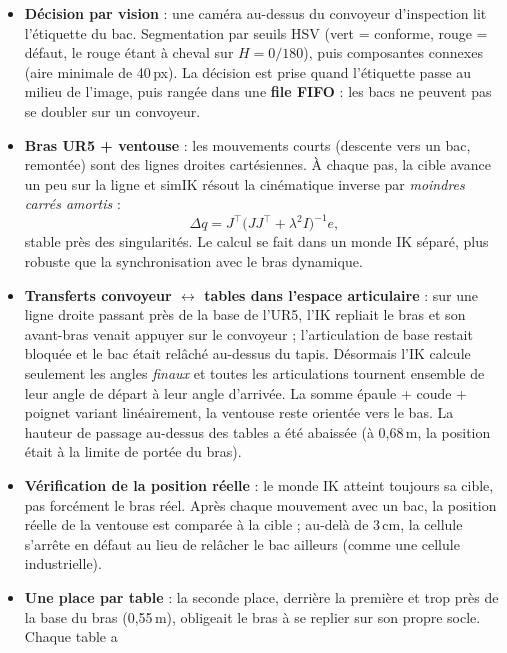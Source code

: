 \documentclass[11pt,a4paper]{article}
\begin{document}
\begin{itemize}
  \item \textbf{Décision par vision} : une caméra au-dessus du convoyeur d'inspection lit
        l'étiquette du bac. Segmentation par seuils HSV (vert = conforme, rouge = défaut, le rouge
        étant à cheval sur $H = 0/180$), puis composantes connexes (aire minimale de 40\,px). La
        décision est prise quand l'étiquette passe au milieu de l'image, puis rangée dans une
        \textbf{file FIFO} : les bacs ne peuvent pas se doubler sur un convoyeur.
  \item \textbf{Bras UR5 + ventouse} : les mouvements courts (descente vers un bac, remontée) sont
        des lignes droites cartésiennes. À chaque pas, la cible avance un peu sur la ligne et simIK
        résout la cinématique inverse par \emph{moindres carrés amortis} :
        \begin{equation}
          \Delta q = J^\top\big(J J^\top + \lambda^2 I\big)^{-1} e,
        \end{equation}
        stable près des singularités. Le calcul se fait dans un monde IK séparé, plus robuste que
        la synchronisation avec le bras dynamique.
  \item \textbf{Transferts convoyeur $\leftrightarrow$ tables dans l'espace articulaire} : sur une
        ligne droite passant près de la base de l'UR5, l'IK repliait le bras et son avant-bras
        venait appuyer sur le convoyeur ; l'articulation de base restait bloquée et le bac était
        relâché au-dessus du tapis. Désormais l'IK calcule seulement les angles \emph{finaux} et
        toutes les articulations tournent ensemble de leur angle de départ à leur angle d'arrivée.
        La somme épaule + coude + poignet variant linéairement, la ventouse reste orientée vers le
        bas. La hauteur de passage au-dessus des tables a été abaissée (à 0,68\,m, la position était
        à la limite de portée du bras).
  \item \textbf{Vérification de la position réelle} : le monde IK atteint toujours sa cible, pas
        forcément le bras réel. Après chaque mouvement avec un bac, la position réelle de la
        ventouse est comparée à la cible ; au-delà de 3\,cm, la cellule s'arrête en défaut au lieu
        de relâcher le bac ailleurs (comme une cellule industrielle).
  \item \textbf{Une place par table} : la seconde place, derrière la première et trop près de la
        base du bras (0,55\,m), obligeait le bras à se replier sur son propre socle. Chaque table a

\end{itemize}
\end{document}

